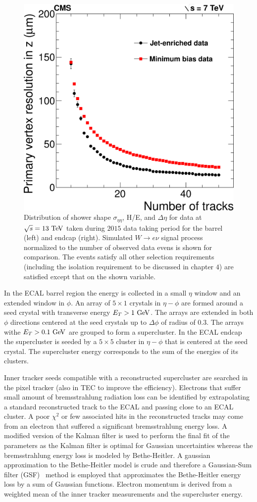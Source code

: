 \begin{figure}[h]
\includegraphics[width=0.32\columnwidth]{figures_chapter4/vertex_resolution}
\caption{Distribution of shower shape $\sigma_{\eta \eta}$, H/E, and $\Delta \eta$ for data at $\sqrt{s}=13~\mathrm{Te\kern -0.1em V}$ taken during $2015$ data taking period for the barrel (left) and endcap (right). Simulated $W \rightarrow e \nu$ signal process normalized to the number of observed data evens is shown for comparison. The events satisfy all other selection requirements (including the isolation requirement to be discussed in chapter $4$) are satisfied except that on the shown variable.}
\label{fig:ele_id}
\end{figure}

In the ECAL barrel region the energy is collected in a small $\eta$ window and an extended window in $\phi$.  An array of $5\times1$ crystals in $\eta-\phi$ are formed around a seed crystal with transverse energy $E_{T}>1~\mathrm{Ge\kern -0.1em V}$. The arrays are extended in both $\phi$ directions centered at the seed crystals up to $\Delta \phi$ of radius of $0.3$. The arrays withe $E_{T}>0.1~\mathrm{Ge\kern -0.1em V}$ are grouped to form a supercluster. In the ECAL endcap the supercluster is seeded by a $5\times5$ cluster in $\eta-\phi$ that is centered at the seed crystal. The supercluster energy corresponds to the sum of the energies of its clusters. 

Inner tracker seeds compatible with a reconstructed supercluster are searched in the pixel tracker (also in TEC to improve the efficiency). Electrons that suffer small amount of bremsstrahlung radiation loss can be identified by extrapolating a standard reconstructed track to the ECAL and passing close to an ECAL cluster. A poor $\chi^2$ or few associated hits in the reconstructed tracks may come from an electron that suffered a significant bremsstrahlung energy loss. A modified version of the Kalman filter is used to perform the final fit of the parameters as the Kalman filter is optimal for Gaussian uncertainties whereas the bremsstrahlung energy loss is modeled by Bethe-Heitler.  A gaussian approximation to the Bethe-Heitler model is crude and therefore a Gaussian-Sum filter (GSF)~\cite{Adam:815410} method is employed that approximates the Bethe-Heitler energy loss by a sum of Gaussian functions. Electron momentum is derived from a weighted mean of the inner tracker measurements and the supercluster energy. 

